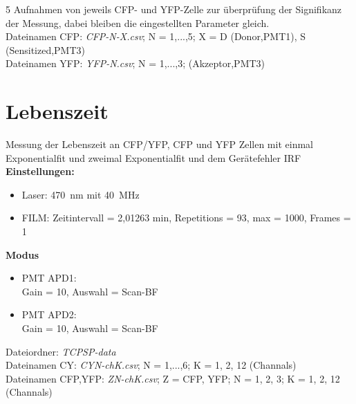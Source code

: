 5 Aufnahmen von jeweils CFP- und YFP-Zelle zur überprüfung der Signifikanz der Messung, dabei bleiben die eingestellten Parameter gleich.\\
Dateinamen CFP: \textit{CFP-N-X.csv}; N = 1,...,5; X = D (Donor,PMT1), S (Sensitized,PMT3)\\
Dateinamen YFP: \textit{YFP-N.csv}; N = 1,...,3; (Akzeptor,PMT3)\\

\section*{Lebenszeit}
Messung der Lebenszeit an CFP/YFP, CFP und YFP Zellen mit einmal Exponentialfit und zweimal Exponentialfit und dem Gerätefehler IRF\\

\textbf{Einstellungen:}
\begin{itemize}
    \item Laser: \SI{470}{\nano\metre} mit \SI{40}{\mega\hertz}
    \item FILM: Zeitintervall = 2,01263 min, Repetitions = 93, max = 1000, Frames = 1  
\end{itemize}

\textbf{Modus}
\begin{itemize}
    \item PMT APD1:\\
    Gain = 10, Auswahl = Scan-BF
    \item PMT APD2:\\
    Gain = 10, Auswahl = Scan-BF
\end{itemize}

Dateiordner: \textit{TCPSP-data}\\
Dateinamen CY: \textit{CYN-chK.csv}; N = 1,...,6; K = 1, 2, 12 (Channals)\\
Dateinamen CFP,YFP: \textit{ZN-chK.csv}; Z = CFP, YFP; N = 1, 2, 3;  K = 1, 2, 12 (Channals)